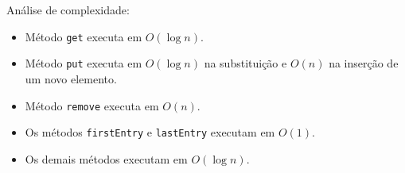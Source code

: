 \medskip

Análise de complexidade:
\begin{itemize}
	\item Método \texttt{get} executa em $O(\log n)$.
	\item Método \texttt{put} executa em $O(\log n)$ na substituição e $O(n)$ na inserção de um novo elemento.
	\item Método \texttt{remove} executa em $O(n)$.
	\item Os métodos \texttt{firstEntry} e \texttt{lastEntry} executam em $O(1)$.
	\item Os demais métodos executam em $O(\log n)$.
\end{itemize}

\clearpage


